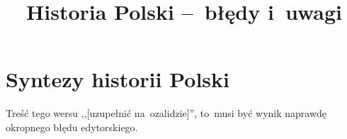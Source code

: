 \documentclass[a4paper,11pt]{article}
\title{Historia Polski --~błędy i~uwagi}
\begin{document}



\maketitle  %



\section{Syntezy historii Polski}

\vspace{\spaceTwo}







\start {} Treść tego wersu ,,[uzupełnić na~ozalidzie]'',
to~musi być wynik naprawdę okropnego błędu edytorskiego.

\end{document}
